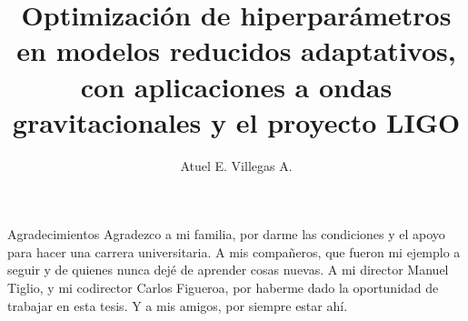 \documentclass[12pt,screen,twoside,pagebackref]{ibtesis}
\title{Optimización de hiperparámetros en modelos reducidos adaptativos, con aplicaciones a ondas gravitacionales y el proyecto LIGO}
\author{Atuel E. Villegas A.}
\begin{document}

\begin{preliminary}




\tableofcontents                %





\end{preliminary}







\appendix
%

\begin{biblio}

\end{biblio}


\begin{postliminary}


\begin{seccion}{Agradecimientos}
Agradezco a mi familia, por darme las condiciones y el apoyo para hacer una carrera universitaria. 
A mis compañeros, que fueron mi ejemplo a seguir y de quienes nunca dejé de aprender cosas nuevas. 
A mi director Manuel Tiglio, y mi codirector Carlos Figueroa, por haberme dado la oportunidad de trabajar en esta tesis. 
Y a mis amigos, por siempre estar ahí. 
\end{seccion}

\end{postliminary}
\end{document}

